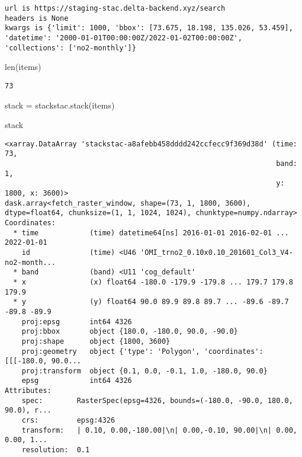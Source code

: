\documentclass[
  letterpaper,
  DIV=11,
  numbers=noendperiod]{scrreprt}
\newenvironment{Shaded}{\begin{snugshade}}{\end{snugshade}}
\newcommand{\BuiltInTok}[1]{\textcolor[rgb]{0.00,0.46,0.62}{#1}}
\newcommand{\NormalTok}[1]{\textcolor[rgb]{0.00,0.46,0.62}{#1}}
\newcommand{\OperatorTok}[1]{\textcolor[rgb]{0.37,0.37,0.37}{#1}}
\begin{document}
\begin{verbatim}
url is https://staging-stac.delta-backend.xyz/search
headers is None
kwargs is {'limit': 1000, 'bbox': [73.675, 18.198, 135.026, 53.459], 'datetime': '2000-01-01T00:00:00Z/2022-01-02T00:00:00Z', 'collections': ['no2-monthly']}
\end{verbatim}

\begin{Shaded}
\begin{Highlighting}[]
\BuiltInTok{len}\NormalTok{(items)}
\end{Highlighting}
\end{Shaded}

\begin{verbatim}
73
\end{verbatim}

\begin{Shaded}
\begin{Highlighting}[]
\NormalTok{stack }\OperatorTok{=}\NormalTok{ stackstac.stack(items)}
\end{Highlighting}
\end{Shaded}

\begin{Shaded}
\begin{Highlighting}[]
\NormalTok{stack}
\end{Highlighting}
\end{Shaded}

\begin{verbatim}
<xarray.DataArray 'stackstac-a8afebb458dddd242ccfecc9f369d38d' (time: 73,
                                                                band: 1,
                                                                y: 1800, x: 3600)>
dask.array<fetch_raster_window, shape=(73, 1, 1800, 3600), dtype=float64, chunksize=(1, 1, 1024, 1024), chunktype=numpy.ndarray>
Coordinates:
  * time            (time) datetime64[ns] 2016-01-01 2016-02-01 ... 2022-01-01
    id              (time) <U46 'OMI_trno2_0.10x0.10_201601_Col3_V4-no2-month...
  * band            (band) <U11 'cog_default'
  * x               (x) float64 -180.0 -179.9 -179.8 ... 179.7 179.8 179.9
  * y               (y) float64 90.0 89.9 89.8 89.7 ... -89.6 -89.7 -89.8 -89.9
    proj:epsg       int64 4326
    proj:bbox       object {180.0, -180.0, 90.0, -90.0}
    proj:shape      object {1800, 3600}
    proj:geometry   object {'type': 'Polygon', 'coordinates': [[[-180.0, 90.0...
    proj:transform  object {0.1, 0.0, -0.1, 1.0, -180.0, 90.0}
    epsg            int64 4326
Attributes:
    spec:        RasterSpec(epsg=4326, bounds=(-180.0, -90.0, 180.0, 90.0), r...
    crs:         epsg:4326
    transform:   | 0.10, 0.00,-180.00|\n| 0.00,-0.10, 90.00|\n| 0.00, 0.00, 1...
    resolution:  0.1
\end{verbatim}
\end{document}

